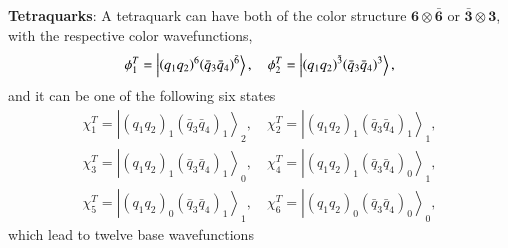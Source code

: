 \documentclass[prd,twocolumn,floatfix,nofootinbib]{revtex4}
\begin{document}
\textbf{Tetraquarks}: A tetraquark can have both of the color structure $%
\boldsymbol{6}\otimes \boldsymbol{\bar{6}}$ or $\boldsymbol{\bar{3}}\otimes
\boldsymbol{3}$, with the respective color wavefunctions,
\begin{equation}
\phi _{1}^{T}=\left\vert {\left( q_{1}q_{2}\right) }^{6}{\left( \bar{q}_{3}%
\bar{q}_{4}\right) }^{\bar{6}}\right\rangle ,\quad \phi _{2}^{T}=\left\vert {%
\left( q_{1}q_{2}\right) }^{\bar{3}}{\left( \bar{q}_{3}\bar{q}_{4}\right) }%
^{3}\right\rangle ,  \label{colorT}
\end{equation}%
and it can be one of the following six states
\begin{equation}
\begin{aligned} \chi_{1}^{T}={\left| {\left(q_{1}q_{2}\right)}_{1}
{\left(\bar{q}_{3}\bar{q}_{4}\right)}_{1} \right\rangle}_{2}, \quad
\chi_{2}^{T}={\left| {\left(q_{1}q_{2}\right)}_{1}
{\left(\bar{q}_{3}\bar{q}_{4}\right)}_{1} \right\rangle}_{1}, \\
\chi_{3}^{T}={\left| {\left(q_{1}q_{2}\right)}_{1}
{\left(\bar{q}_{3}\bar{q}_{4}\right)}_{1} \right\rangle}_{0}, \quad
\chi_{4}^{T}={\left| {\left(q_{1}q_{2}\right)}_{1}
{\left(\bar{q}_{3}\bar{q}_{4}\right)}_{0} \right\rangle}_{1}, \\
\chi_{5}^{T}={\left| {\left(q_{1}q_{2}\right)}_{0}
{\left(\bar{q}_{3}\bar{q}_{4}\right)}_{1} \right\rangle}_{1}, \quad
\chi_{6}^{T}={\left| {\left(q_{1}q_{2}\right)}_{0}
{\left(\bar{q}_{3}\bar{q}_{4}\right)}_{0} \right\rangle}_{0}, \end{aligned}
\label{spinT}
\end{equation}%
which lead to twelve base wavefunctions
\end{document}
